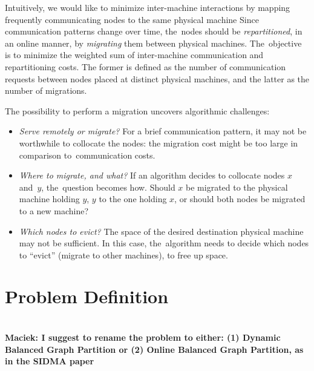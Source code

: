 \documentclass[manuscript,screen=true]{acmart}
\newcommand\maciek[1]{\color{brown}\textbf{\\ Maciek: #1}\color{black}}
\begin{document}
Intuitively, we would like to minimize inter-machine
interactions by mapping frequently communicating nodes to the same physical machine
Since communication patterns change over time, the~nodes should be \emph{repartitioned}, in
an online manner, by \emph{migrating} them between physical machines.
The~objective is to minimize the weighted sum of inter-machine communication and repartitioning costs.
The former is defined as the number of communication requests between nodes placed at distinct physical machines, and the latter as the number of migrations.


The possibility to perform a migration uncovers algorithmic challenges:
\begin{itemize}

\item \emph{Serve remotely or migrate?} For a brief communication
pattern, it may not be worthwhile to collocate the nodes: the migration cost might
be too large in comparison to~communication costs.

\item \emph{Where to migrate, and what?}
If an algorithm decides to collocate nodes $x$ and~$y$, the~question becomes
how. Should $x$ be migrated to the physical machine holding $y$, $y$ to the one holding
$x$, or should both nodes be migrated to a new machine?

\item \emph{Which nodes to evict?}
The space of the desired destination physical machine may not be sufficient. In
this case, the~algorithm needs to decide which nodes to ``evict'' (migrate to
other machines), to free up space.

\end{itemize}


\section{Problem Definition}
\label{sec:problem-definition}

\maciek{I suggest to rename the problem to either: (1) Dynamic Balanced Graph Partition or (2) Online Balanced Graph Partition, as in the SIDMA paper}
\end{document}
